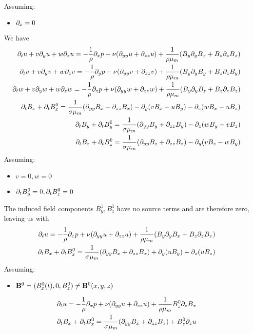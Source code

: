 \documentclass[11pt]{article}
\begin{document}
Assuming:
\begin{itemize}\setlength\itemsep{-1em}
	\item $\partial_x=0$
\end{itemize}
We have
\begin{equation}\begin{aligned}
\partial_t u+ v\partial_y u + w\partial_z u = -\frac{1}{\rho}\partial_x p+ \nu (\partial_{yy} u+\partial_{zz} u) + \frac{1}{\rho {\mu_m}} (B_y \partial_y B_x + B_z \partial_z B_x) \\
\partial_t v+ v\partial_y v + w\partial_z v = -\frac{1}{\rho}\partial_y p+ \nu (\partial_{yy} v+\partial_{zz} v) + \frac{1}{\rho {\mu_m}} (B_y \partial_y B_y + B_z \partial_z B_y) \\
\partial_t w+ v\partial_y w + w\partial_z w = -\frac{1}{\rho}\partial_z p+ \nu (\partial_{yy} w+\partial_{zz} w) + \frac{1}{\rho {\mu_m}} (B_y \partial_y B_z + B_z \partial_z B_z) \\
\partial_t B_x + \partial_t B_x^0 = \frac{1}{\sigma {\mu_m}} (\partial_{yy} B_x+\partial_{zz} B_x) - \partial_y (v B_x - u B_y) - \partial_z (w B_x - u B_z) \\
\partial_t B_y + \partial_t B_y^0 = \frac{1}{\sigma {\mu_m}} (\partial_{yy} B_y+\partial_{zz} B_y)                         - \partial_z (w B_y - v B_z) \\
\partial_t B_z + \partial_t B_z^0 = \frac{1}{\sigma {\mu_m}} (\partial_{yy} B_z+\partial_{zz} B_z) - \partial_y (v B_z - w B_y)                         \\
\end{aligned} \end{equation}
Assuming:
\begin{itemize}\setlength\itemsep{-1em}
	\item $v=0,w=0$
	\item $\partial_t B_y^0 = 0, \partial_t B_z^0 = 0$
\end{itemize}
The induced field components $B_y^1,B_z^1$ have no source terms and are therefore zero, leaving us with
\begin{equation}\begin{aligned}
\partial_t u  = -\frac{1}{\rho}\partial_x p+ \nu (\partial_{yy} u+\partial_{zz} u) + \frac{1}{\rho {\mu_m}} (B_y \partial_y B_x + B_z \partial_z B_x) \\
\partial_t B_x + \partial_t B_x^0 = \frac{1}{\sigma {\mu_m}} (\partial_{yy} B_x+\partial_{zz} B_x) + \partial_y (u B_y) + \partial_z (u B_z) \\
\end{aligned} \end{equation}
Assuming:
\begin{itemize}\setlength\itemsep{-1em}
	\item $\mathbf{B}^0 = (B_x^0(t),0,B_z^0) \ne \mathbf{B}^0(x,y,z)$
\end{itemize}
\begin{equation}\begin{aligned}
\partial_t u                 = -\frac{1}{\rho}\partial_x p+ \nu (\partial_{yy} u+\partial_{zz} u) + \frac{1}{\rho {\mu_m}} B_z^0 \partial_z B_x \\
\partial_t B_x + \partial_t B_x^0 = \frac{1}{\sigma {\mu_m}} (\partial_{yy} B_x+\partial_{zz} B_x) + B_z^0 \partial_z u \\
\end{aligned} \end{equation}
\end{document}
